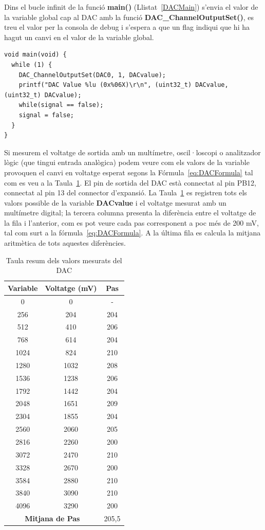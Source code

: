 Dins el bucle infinit de la funció {\bf main()} (Llistat~\ref{DACMain}) s'envia el valor de la variable global cap al DAC amb la funció {\bf DAC\_ChannelOutputSet()}, es treu el valor per la consola de debug i s'espera a que un \gls{flag} indiqui que hi ha hagut un canvi en el valor de la variable global.

\begin{lstlisting}[style=customc, caption=Bucle infinit del DAC, label=DACMain]
void main(void) {
  while (1) {
    DAC_ChannelOutputSet(DAC0, 1, DACvalue);
    printf("DAC Value %lu (0x%06X)\r\n", (uint32_t) DACvalue, (uint32_t) DACvalue);
    while(signal == false);
    signal = false;
  }
}
\end{lstlisting}

Si mesurem el voltatge de sortida amb un multímetre, oscil·loscopi o analitzador lògic (que tingui entrada analògica) podem veure com els valors de la variable provoquen el canvi en voltatge esperat segons la Fórmula~\ref{eq:DACFormula} tal com es veu a la Taula~\ref{tb:DACVoltages}. El pin de sortida del DAC està connectat al pin PB12, connectat al pin 13 del connector d'expansió. La Taula~\ref{tb:DACVoltages} es registren tots els valors possible de la variable {\bf DACvalue} i el voltatge mesurat amb un multímetre digital; la tercera columna presenta la diferència entre el voltatge de la fila i l'anterior, com es pot veure cada pas corresponent a poc més de 200 mV, tal com surt a la fórmula~\ref{eq:DACFormula}. A la última fila es calcula la mitjana aritmètica de tots aquestes diferències.


\begin{table}
\caption{Taula resum dels valors mesurats del DAC}
\centering
\begin{tabular}{|c|c|c|}
\hline
{\bf Variable} & {\bf Voltatge (mV)} & {\bf Pas}\\
\hline
0 & 0 & - \\
256	& 204 & 204 \\
512	& 410 & 206 \\
768	& 614 & 204 \\
1024	& 824 & 210 \\
1280	& 1032 & 208 \\
1536	& 1238 & 206 \\
1792	& 1442 & 204 \\
2048	& 1651 & 209 \\
2304	& 1855 & 204 \\
2560	& 2060 & 205 \\
2816	& 2260 & 200 \\
3072	& 2470 & 210 \\
3328	& 2670 & 200 \\
3584	& 2880 & 210 \\
3840	& 3090 & 210 \\
4096	& 3290 & 200 \\
\hline
\multicolumn{2}{|c|}{\bf Mitjana de Pas} & 205,5 \\
\hline
\end{tabular}
\label{tb:DACVoltages}
\end{table}

